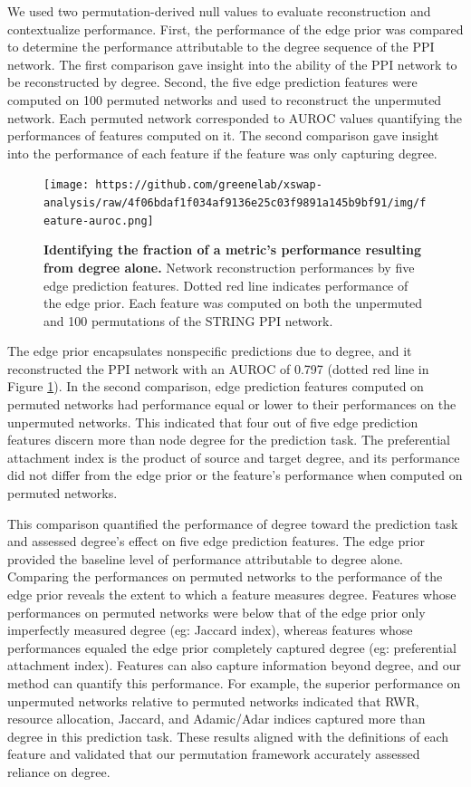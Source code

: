 We used two permutation-derived null values to evaluate reconstruction and contextualize performance.
First, the performance of the edge prior was compared to determine the performance attributable to the degree sequence of the PPI network.
The first comparison gave insight into the ability of the PPI network to be reconstructed by degree.
Second, the five edge prediction features were computed on 100 permuted networks and used to reconstruct the unpermuted network.
Each permuted network corresponded to AUROC values quantifying the performances of features computed on it.
The second comparison gave insight into the performance of each feature if the feature was only capturing degree.

\begin{figure}
\hypertarget{fig:feature-auroc}{%
\centering
\texttt{[image: https://github.com/greenelab/xswap-analysis/raw/4f06bdaf1f034af9136e25c03f9891a145b9bf91/img/feature-auroc.png]}
\caption{\textbf{Identifying the fraction of a metric's performance resulting from degree alone.}
Network reconstruction performances by five edge prediction features.
Dotted red line indicates performance of the edge prior.
Each feature was computed on both the unpermuted and 100 permutations of the STRING PPI network.}\label{fig:feature-auroc}
}
\end{figure}

The edge prior encapsulates nonspecific predictions due to degree, and it reconstructed the PPI network with an AUROC of 0.797 (dotted red line in Figure \ref{fig:feature-auroc}).
In the second comparison, edge prediction features computed on permuted networks had performance equal or lower to their performances on the unpermuted networks.
This indicated that four out of five edge prediction features discern more than node degree for the prediction task.
The preferential attachment index is the product of source and target degree, and its performance did not differ from the edge prior or the feature's performance when computed on permuted networks.

This comparison quantified the performance of degree toward the prediction task and assessed degree's effect on five edge prediction features.
The edge prior provided the baseline level of performance attributable to degree alone.
Comparing the performances on permuted networks to the performance of the edge prior reveals the extent to which a feature measures degree.
Features whose performances on permuted networks were below that of the edge prior only imperfectly measured degree (eg: Jaccard index), whereas features whose performances equaled the edge prior completely captured degree (eg: preferential attachment index).
Features can also capture information beyond degree, and our method can quantify this performance.
For example, the superior performance on unpermuted networks relative to permuted networks indicated that RWR, resource allocation, Jaccard, and Adamic/Adar indices captured more than degree in this prediction task.
These results aligned with the definitions of each feature and validated that our permutation framework accurately assessed reliance on degree.


